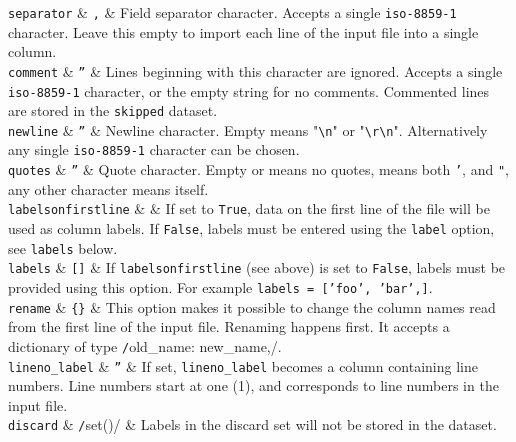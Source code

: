  \RP \texttt{separator} & \texttt{,} & Field separator character.  Accepts a
 single \texttt{iso-8859-1} character.  Leave this empty to import
 each line of the input file into a single column.  \\

 \RP \texttt{comment} & \texttt{''} & Lines beginning with this
 character are ignored.  Accepts a single \texttt{iso-8859-1}
 character, or the empty string for no comments. Commented lines are
 stored in the \texttt{skipped} dataset.\\

\RP \texttt{newline} & \texttt{''} & Newline character.  Empty means
"\texttt{\textbackslash{}n}" or "\texttt{\textbackslash{}r\textbackslash{}n}".
Alternatively any single \texttt{iso-8859-1} character can be chosen.\\

\RP \texttt{quotes} & \texttt{''} & Quote character.  Empty or \pyFalse means no
quotes, \pyTrue means both \texttt{'}, and \texttt{"}, any other
character means itself. \\

\RP \texttt{labelsonfirstline} & \pyTrue & If set to
\texttt{True}, data on the first line of the file will
be used as column labels.  If \texttt{False}, labels must
be entered using the \texttt{label} option, see \texttt{labels}
below.\\

\RP \texttt{labels} & \texttt{[]} & If \texttt{labelsonfirstline} (see
above) is set to \texttt{False}, labels must be provided
using this option.  For example \texttt{labels = ['foo',
'bar',]}.\\

\RP \texttt{rename} & \texttt{\{\}} & This option makes it possible to
change the column names read from the first line of the input file.
Renaming happens first.  It accepts a dictionary of type
\texttt/{old_name: new_name,}/.\\

\RP \texttt{lineno\_label} & \texttt{''} & If set,
\texttt{lineno\_label} becomes a column containing line numbers.
Line numbers start at one (1), and corresponds to line numbers in the
input file.  \\

\RP \texttt{discard} & \texttt/set()/ & Labels in the discard set will
not be stored in the dataset.\\

